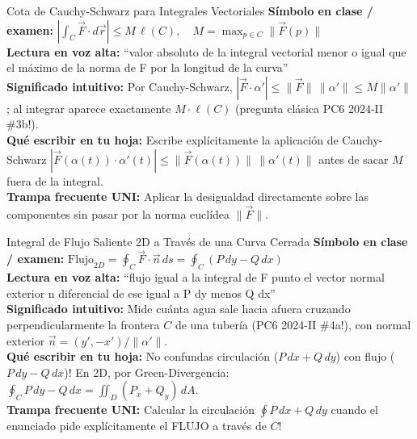\documentclass[11pt,a4paper]{article}
\begin{document}
\begin{definicionbox}{Cota de Cauchy-Schwarz para Integrales Vectoriales}
\textbf{Símbolo en clase / examen:} $\left|\int_C \vec{F} \cdot d\vec{r}\right| \le M\,\ell(C), \quad M = \max_{p \in C} \|\vec{F}(p)\|$\\[0.15cm]
\textbf{Lectura en voz alta:} ``valor absoluto de la integral vectorial menor o igual que el máximo de la norma de F por la longitud de la curva''\\[0.12cm]
\textbf{Significado intuitivo:} Por Cauchy-Schwarz, $|\vec{F}\cdot\alpha'| \le \|\vec{F}\|\,\|\alpha'\| \le M\|\alpha'\|$; al integrar aparece exactamente $M\cdot\ell(C)$ (pregunta clásica PC6 2024-II \#3b!).\\[0.12cm]
\textbf{Qué escribir en tu hoja:} Escribe explícitamente la aplicación de Cauchy-Schwarz $|\vec{F}(\alpha(t))\cdot\alpha'(t)| \le \|\vec{F}(\alpha(t))\|\,\|\alpha'(t)\|$ antes de sacar $M$ fuera de la integral.\\[0.12cm]
\textbf{Trampa frecuente UNI:} Aplicar la desigualdad directamente sobre las componentes sin pasar por la norma euclídea $\|\vec{F}\|$.
\end{definicionbox}

\begin{definicionbox}{Integral de Flujo Saliente 2D a Través de una Curva Cerrada}
\textbf{Símbolo en clase / examen:} $\text{Flujo}_{2D} = \oint_C \vec{F} \cdot \vec{n}\,ds = \oint_C (P\,dy - Q\,dx)$\\[0.15cm]
\textbf{Lectura en voz alta:} ``flujo igual a la integral de F punto el vector normal exterior n diferencial de ese igual a P dy menos Q dx''\\[0.12cm]
\textbf{Significado intuitivo:} Mide cuánta agua sale hacia afuera cruzando perpendicularmente la frontera $C$ de una tubería (PC6 2024-II \#4a!), con normal exterior $\vec{n} = (y', -x')/\|\alpha'\|$.\\[0.12cm]
\textbf{Qué escribir en tu hoja:} No confundas circulación ($P\,dx + Q\,dy$) con flujo ($P\,dy - Q\,dx$)! En 2D, por Green-Divergencia: $\oint_C P\,dy - Q\,dx = \iint_D (P_x + Q_y)\,dA$.\\[0.12cm]
\textbf{Trampa frecuente UNI:} Calcular la circulación $\oint P\,dx + Q\,dy$ cuando el enunciado pide explícitamente el FLUJO a través de $C$!
\end{definicionbox}
\end{document}

